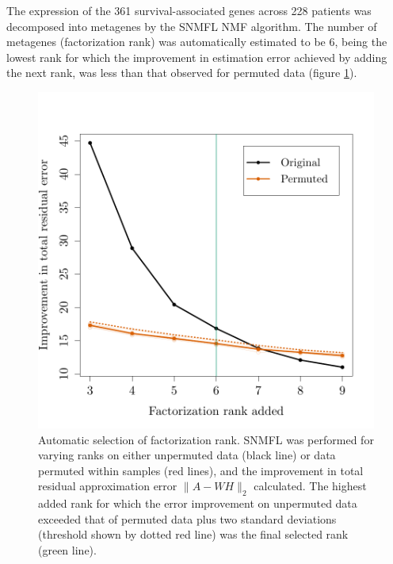 \documentclass[dissertation.tex]{subfiles}
\begin{document}

The expression of the 361 survival-associated genes across 228 patients was decomposed into metagenes by the \gls{SNMFL} \gls{NMF} algorithm.  The number of metagenes (factorization rank) was automatically estimated to be 6, being the lowest rank for which the improvement in estimation error achieved by adding the next rank, was less than that observed for permuted data (figure \ref{fig:sigs-nmf-rank}).

\begin{figure}
\centering
\includegraphics[width=.7\linewidth]{analysis/biosurv/reports/18_SIS_diag_dsd_final/figure/nmf-rank-plots-2}
\caption{Automatic selection of factorization rank.  \acrshort{SNMFL} was performed for varying ranks on either unpermuted data (black line) or data permuted within samples (red lines), and the improvement in total residual approximation error $\|A - W H\|_2$ calculated.  The highest added rank for which the error improvement on unpermuted data exceeded that of permuted data plus two standard deviations (threshold shown by dotted red line) was the final selected rank (green line).}
\label{fig:sigs-nmf-rank}
\end{figure}
\end{document}

